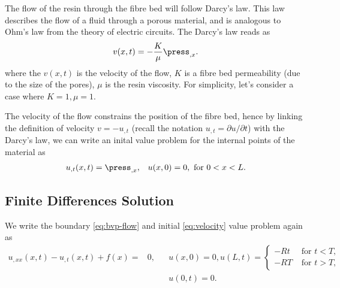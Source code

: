 \documentclass[twoside,a4paper,12pt]{article}
\newcommand{\note}[1]{{\color{red}\newline(#1)}}
\newcommand{\+}[2]{\newcommand#1{{\color{\notcolor}#2}}}
\newcommand{\1}[2]{\newcommand{#1}[1]{{\color{\notcolor}#2}}}
\newcommand{\2}[2]{\newcommand{#1}[2]{{\color{\notcolor}#2}}}
\begin{document}
%

The flow of the resin through the fibre bed will follow Darcy's law.
This law describes the flow of a fluid through a porous material, and
is analogous to Ohm's law from the theory of electric circuits. The
Darcy's law reads as
%
\begin{align}
  v(x,t) = -\frac{K}{\mu} \press_{,x}. \label{eq:darcy}
\end{align}
where the $v(x,t)$ is the velocity of the flow, $K$ is a fibre bed
permeability (due to the size of the pores),
%
%
$\mu$ is the resin viscosity.
%
%
For simplicity, let's consider a case where $K=1, \mu=1$.
%

The velocity of the flow constrains the position of the fibre bed,
hence by linking the definition of velocity $v = - u_{,t}$ (recall the
notation $u_{,t} = \partial u/\partial t$) with the Darcy's law, we
can write an inital value problem for the internal points of the
material as
%
\begin{align}
  u_{,t}(x,t) =  \press_{,x} , && u(x,0) = 0 , \text{ for } 0 < x < L. \label{eq:velocity}
\end{align}


\subsection{Finite Differences Solution}

We write the boundary \eqref{eq:bvp-flow} and initial
\eqref{eq:velocity} value problem again as
%
\begin{align}
  \label{eq:heat}
  u_{,xx}(x,t) - u_{,t}(x,t) + f(x) 
  =& 0 ,        &&u(x,0) = 0, u(L,t) =
            \begin{cases}
              -Rt &\text{ for } t < T,\\
              -RT &\text{ for } t > T,
            \end{cases}\\\nonumber
 &&& u(0,t) = 0.
\end{align}
\end{document}
